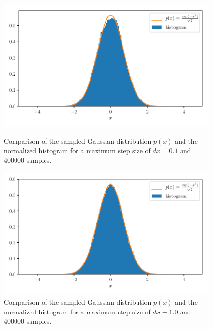 \documentclass[a4paper,10pt,bibtotoc]{scrartcl}
\begin{document}
\begin{figure}[H]
	\centering
	\includegraphics[width=\linewidth]{hist01.pdf}
	\caption{Comparison of the sampled Gaussian distribution $p(x)$ and the normalized histogram for a maximum step size of $dx=0.1$ and 400000 samples.}
	\label{fig:fig4}
	\includegraphics[width=\linewidth]{hist1.pdf}
	\caption{Comparison of the sampled Gaussian distribution $p(x)$ and the normalized histogram for a maximum step size of $dx=1.0$ and 400000 samples.}
	\label{fig:fig5}
\end{figure}
\end{document}
